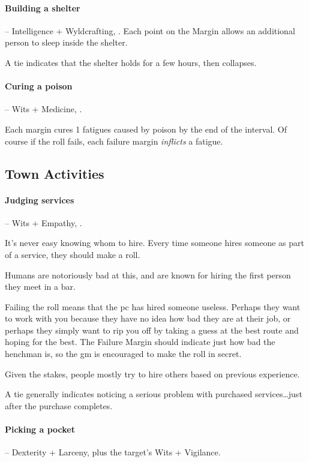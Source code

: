 \begin{multicols}{2}
\paragraph{Building a shelter} -- Intelligence + Wyldcrafting, .
Each point on the Margin allows an additional person to sleep inside the shelter.

A tie indicates that the shelter holds for a few hours, then collapses.

\paragraph{Curing a poison} -- Wits + Medicine, .

Each margin cures 1 \glspl{fatigue} caused by poison by the end of the interval.
Of course if the roll fails, each failure margin \emph{inflicts} a \gls{fatigue}.


\subsection{Town Activities}

\paragraph{Judging services} -- Wits + Empathy, .

It's never easy knowing whom to hire.
Every time someone hires someone as part of a service, they should make a roll.

Humans are notoriously bad at this, and are known for hiring the first person they meet in a bar.

Failing the roll means that the \gls{pc} has hired someone useless.
Perhaps they want to work with you because they have no idea how bad they are at their job, or perhaps they simply want to rip you off by taking a guess at the best route and hoping for the best.
The Failure Margin should indicate just how bad the henchman is, so the \gls{gm} is encouraged to make the roll in secret.

Given the stakes, people mostly try to hire others based on previous experience.

A tie generally indicates noticing a serious problem with purchased services\ldots just after the purchase completes.

\paragraph{Picking a pocket} -- Dexterity + Larceny,  plus the target's Wits + Vigilance.


\end{multicols}
